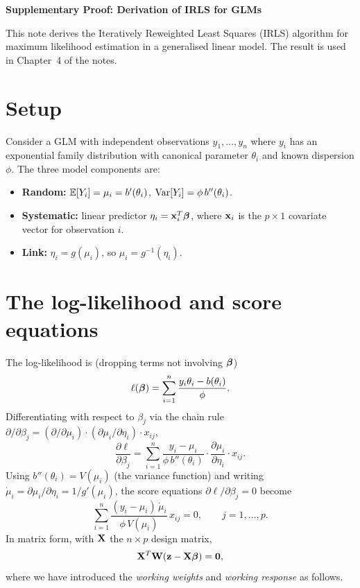 



\moduleheader

\begin{center}
  {\Large\bfseries Supplementary Proof: Derivation of IRLS for GLMs}
\end{center}

\bigskip

\noindent This note derives the Iteratively Reweighted Least Squares
(IRLS) algorithm for maximum likelihood estimation in a generalised
linear model.  The result is used in Chapter~4 of the notes.

\section*{Setup}

Consider a GLM with independent observations $y_1,\dots,y_n$ where
$y_i$ has an exponential family distribution with canonical parameter
$\theta_i$ and known dispersion $\phi$.  The three model components are:
\begin{itemize}
  \item \textbf{Random:} $\mathbb{E}[Y_i] = \mu_i = b'(\theta_i)$,
    $\mathrm{Var}[Y_i] = \phi\,b''(\theta_i)$.
  \item \textbf{Systematic:} linear predictor
    $\eta_i = \mathbf{x}_i^T\boldsymbol{\beta}$, where $\mathbf{x}_i$ is the $p\times 1$
    covariate vector for observation $i$.
  \item \textbf{Link:} $\eta_i = g(\mu_i)$, so
    $\mu_i = g^{-1}(\eta_i)$.
\end{itemize}

\section*{The log-likelihood and score equations}

The log-likelihood is (dropping terms not involving $\boldsymbol{\beta}$)
\[
  \ell(\boldsymbol{\beta}) = \sum_{i=1}^n \frac{y_i\theta_i - b(\theta_i)}{\phi}.
\]
Differentiating with respect to $\beta_j$ via the chain rule
$\partial/\partial\beta_j = (\partial/\partial\mu_i)\cdot(\partial\mu_i/\partial\eta_i)\cdot x_{ij}$,
\[
  \frac{\partial\ell}{\partial\beta_j}
  = \sum_{i=1}^n \frac{y_i - \mu_i}{\phi\,b''(\theta_i)}\cdot
    \frac{\partial\mu_i}{\partial\eta_i}\cdot x_{ij}.
\]
Using $b''(\theta_i) = V(\mu_i)$ (the variance function) and writing
$\dot{\mu}_i = \partial\mu_i/\partial\eta_i = 1/g'(\mu_i)$,
the score equations $\partial\ell/\partial\beta_j = 0$ become
\[
  \sum_{i=1}^n \frac{(y_i-\mu_i)\,\dot{\mu}_i}{\phi\,V(\mu_i)}\,x_{ij} = 0,
  \qquad j=1,\dots,p.
\]
In matrix form, with $\mathbf{X}$ the $n\times p$ design matrix,
\begin{equation}
  \mathbf{X}^T \mathbf{W} (\mathbf{z} - \mathbf{X}\boldsymbol{\beta}) = \mathbf{0},
  \label{eq:score-mat}
\end{equation}
where we have introduced the \emph{working weights} and
\emph{working response} as follows.

